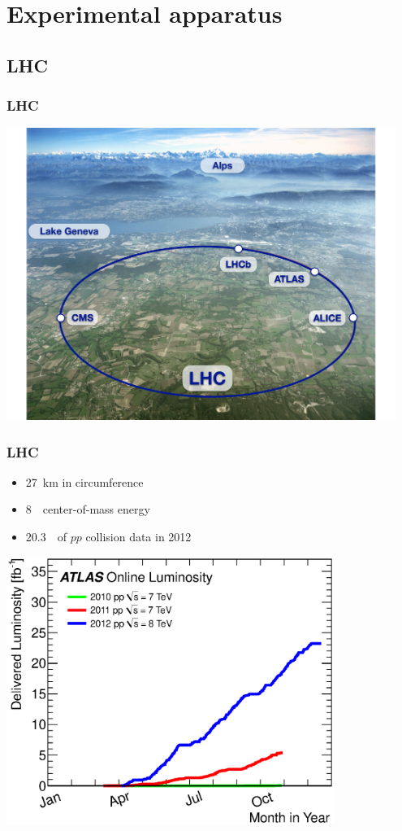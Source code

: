 \documentclass[10pt, svgnames]{beamer}
\begin{document}
\section{Experimental apparatus}
\subsection{LHC}

\begin{frame}
  \frametitle{LHC}
  \begin{center}
    \includegraphics[width=0.95\textwidth]
    {figures/lhc_and_atlas/lhc_aerial.pdf}
  \end{center}
\end{frame}

\begin{frame}
  \frametitle{LHC}
  \begin{itemize}
    \item 27~km in circumference
    \item 8~\TeV\ center-of-mass energy
    \item 20.3~\ifb\ of $pp$ collision data in 2012
  \end{itemize}
  \begin{center}
    \includegraphics[width=0.8\textwidth]
    {figures/lhc_and_atlas/intlumivsyear.eps}
  \end{center}
\end{frame}
\end{document}
